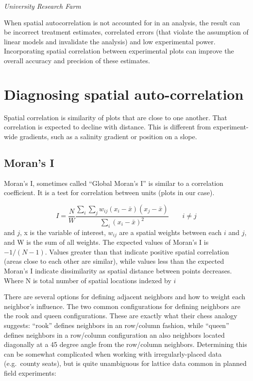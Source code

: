 \documentclass[
]{book}
\begin{document}
\emph{University Research Farm}

When spatial autocorrelation is not accounted for in an analysis, the result can be incorrect treatment estimates, correlated errors (that violate the assumption of linear models and invalidate the analysis) and low experimental power. Incorporating spatial correlation between experimental plots can improve the overall accuracy and precision of these estimates.

\hypertarget{diagnosing-spatial-auto-correlation}{%
\section{Diagnosing spatial auto-correlation}\label{diagnosing-spatial-auto-correlation}}

Spatial correlation is similarity of plots that are close to one another. That correlation is expected to decline with distance. This is different from experiment-wide gradients, such as a salinity gradient or position on a slope.

\hypertarget{morans-i}{%
\subsection{Moran's I}\label{morans-i}}

Moran's I, sometimes called ``Global Moran's I'' is similar to a correlation coefficient. It is a test for correlation between units (plots in our case).

\[ I = \frac{N}{W}\frac{\sum_i \sum_j w_{ij} (x_i - \bar{x})(x_j - \bar{x})}{\sum_i(x_i - \bar{x})^2} 
\qquad i \neq j\]
and \(j\), x is the variable of interest, \(w_{ij}\) are a spatial weights between each \(i\) and \(j\), and W is the sum of all weights. The expected values of Moran's I is \(-1/(N-1)\). Values greater than that indicate positive spatial correlation (areas close to each other are similar), while values less than the expected Moran's I indicate dissimilarity as spatial distance between points decreases.
Where N is total number of spatial locations indexed by \(i\)

There are several options for defining adjacent neighbors and how to weight each neighbor's influence. The two common configurations for defining neighbors are the rook and queen configurations. These are exactly what their chess analogy suggests: ``rook'' defines neighbors in an row/column fashion, while ``queen'' defines neighbors in a row/column configuration an also neighbors located diagonally at a 45 degree angle from the row/column neighbors. Determining this can be somewhat complicated when working with irregularly-placed data (e.g.~county seats), but is quite unambiguous for lattice data common in planned field experiments:
\end{document}
